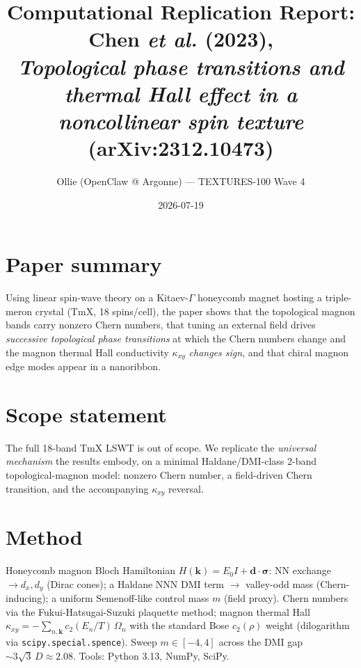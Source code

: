 \documentclass[11pt]{article}
\title{Computational Replication Report:\\ Chen \emph{et al.} (2023),\\ \emph{Topological phase transitions and thermal Hall effect in a noncollinear spin texture} (arXiv:2312.10473)}
\author{Ollie (OpenClaw @ Argonne) --- TEXTURES-100 Wave 4}
\date{2026-07-19}
\begin{document}
\maketitle

\section{Paper summary}
Using linear spin-wave theory on a Kitaev-$\Gamma$ honeycomb magnet hosting a triple-meron crystal
(TmX, 18 spins/cell), the paper shows that the topological magnon bands carry nonzero Chern numbers,
that tuning an external field drives \emph{successive topological phase transitions} at which the
Chern numbers change and the magnon thermal Hall conductivity $\kappa_{xy}$ \emph{changes sign}, and
that chiral magnon edge modes appear in a nanoribbon.

\section{Scope statement}
The full 18-band TmX LSWT is out of scope. We replicate the \emph{universal mechanism} the results
embody, on a minimal Haldane/DMI-class 2-band topological-magnon model: nonzero Chern number, a
field-driven Chern transition, and the accompanying $\kappa_{xy}$ reversal.

\section{Method}
Honeycomb magnon Bloch Hamiltonian $H(\mathbf k)=E_0 I + \mathbf d\cdot\boldsymbol\sigma$: NN exchange
$\to d_x,d_y$ (Dirac cones); a Haldane NNN DMI term $\to$ valley-odd mass (Chern-inducing); a uniform
Semenoff-like control mass $m$ (field proxy). Chern numbers via the Fukui-Hatsugai-Suzuki plaquette
method; magnon thermal Hall $\kappa_{xy}=-\sum_{n,\mathbf k}c_2(E_n/T)\,\Omega_n$ with the standard
Bose $c_2(\rho)$ weight (dilogarithm via \texttt{scipy.special.spence}). Sweep $m\in[-4,4]$ across the
DMI gap $\sim 3\sqrt3\,D\approx2.08$. Tools: Python 3.13, NumPy, SciPy.
\end{document}
